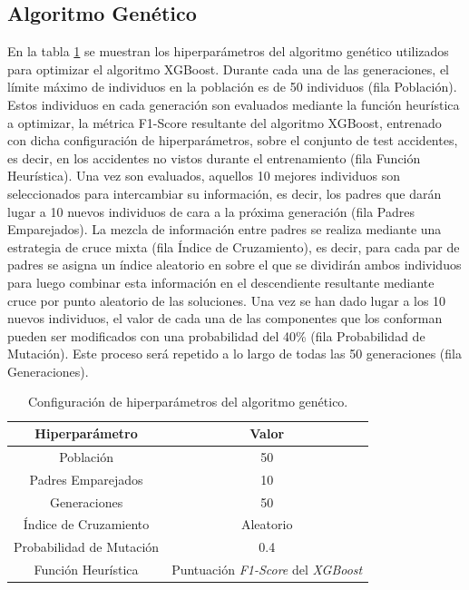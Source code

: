 \documentclass{uathesis-es}
\begin{document}
{		
		\subsection{Algoritmo Genético}
		
		
		En la tabla \ref{GAHyperparametersSetup} se muestran los hiperparámetros del algoritmo genético utilizados para optimizar el algoritmo XGBoost. Durante cada una de las generaciones, el límite máximo de individuos en la población es de 50 individuos (fila Población). Estos individuos en cada generación son evaluados mediante la función heurística a optimizar, la métrica F1-Score resultante del algoritmo XGBoost, entrenado con dicha configuración de hiperparámetros, sobre el conjunto de test accidentes, es decir, en los accidentes no vistos durante el entrenamiento (fila Función Heurística). Una vez son evaluados, aquellos 10 mejores individuos son seleccionados para intercambiar su información, es decir, los padres que darán lugar a 10 nuevos individuos de cara a la próxima generación (fila Padres Emparejados). La mezcla de información entre padres se realiza mediante una estrategia de cruce mixta (fila Índice de Cruzamiento), es decir, para cada par de padres se asigna un índice aleatorio en sobre el que se dividirán ambos individuos para luego combinar esta información en el descendiente resultante mediante cruce por punto aleatorio de las soluciones. Una vez se han dado lugar a los 10 nuevos individuos, el valor de cada una de las componentes que los conforman pueden ser modificados con una probabilidad del 40\% (fila Probabilidad de Mutación). Este proceso será repetido a lo largo de todas las 50 generaciones (fila Generaciones).
		
		
		\begin{table}[H]
			\centering
			\begin{tabular}{|c|c|}
				\hline
				\textbf{Hiperparámetro} & \textbf{Valor} \\ \hline
				\hline
				Población     & 50 \\ \hline
				Padres Emparejados & 10 \\ \hline
				Generaciones    & 50 \\ \hline
				Índice de Cruzamiento & Aleatorio \\ \hline
				Probabilidad de Mutación & 0.4 \\ \hline
				Función Heurística & Puntuación \textit{F1-Score} del \textit{XGBoost} \\ \hline \hline
			\end{tabular}
			\caption{Configuración de hiperparámetros del algoritmo genético.}
			\label{GAHyperparametersSetup}
		\end{table}
		
}
\end{document}
